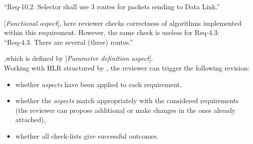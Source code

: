 \small ``Req-10.2.  Selector shall use 3 routes for packets sending to Data Link.'' 

\normalsize [\textit{Functional aspect}], here reviewer checks correctness of algorithms implemented within this requirement. However, the same check is useless for Req-4.3: \\

\small ``Req-4.3.  There are several (three) routes.'' 

\normalsize ,which is defined by [\textit{Parameter definition aspect}].\\

Working with HLR structured by \asp, the reviewer can trigger the following revision:
\begin{itemize}
	\item whether \textit{aspects} have been applied to each requirement,
  \item whether the \textit{aspects} match appropriately with the considered requirements (the reviewer can propose additional \asp or make changes in the ones already attached),
	\item whether all \asp check-lists give successful outcomes.
\end{itemize}
